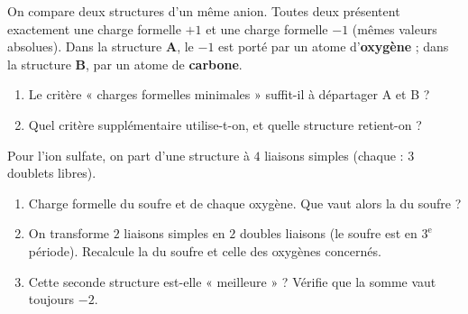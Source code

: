 \documentclass[11pt,a4paper]{article}
\begin{document}
\begin{exo}
On compare deux structures d'un même anion. Toutes deux présentent exactement une charge formelle
$+1$ et une charge formelle $-1$ (mêmes valeurs absolues). Dans la structure \textbf{A}, le $-1$
est porté par un atome d'\textbf{oxygène} ; dans la structure \textbf{B}, par un atome de
\textbf{carbone}.
\begin{enumerate}[label=\alph*)]
  \item Le critère « charges formelles minimales » suffit-il à départager A et B ?
  \item Quel critère supplémentaire utilise-t-on, et quelle structure retient-on ?
\end{enumerate}
\end{exo}

\begin{exo}
Pour l'ion sulfate, on part d'une structure à $4$ liaisons simples  (chaque  : $3$
doublets libres).
\begin{enumerate}[label=\alph*)]
  \item Charge formelle du soufre et de chaque oxygène. Que vaut alors la \CF{} du soufre ?
  \item On transforme $2$ liaisons simples en $2$ doubles liaisons  (le soufre est en
        $3^{\text{e}}$ période). Recalcule la \CF{} du soufre et celle des oxygènes concernés.
  \item Cette seconde structure est-elle « meilleure » ? Vérifie que la somme vaut toujours $-2$.
\end{enumerate}
\end{exo}
\end{document}
